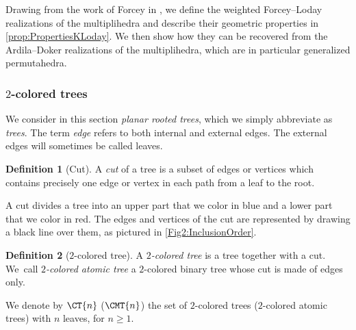 \documentclass[JEP,XML,SOM,NoFloatCountersInSection,Unicode,published]{cedram}
\theoremstyle{definition}
\newtheorem{definition}{Definition}[section]
\theoremstyle{plain}
\begin{document}
Drawing from the work of Forcey in \cite{Forcey08}, we define the weighted Forcey--Loday realizations of the multiplihedra and describe their geometric properties in \cref{prop:PropertiesKLoday}.
We then show how they can be recovered from the Ardila--Doker realizations of the multiplihedra, which are in particular generalized permutahedra.


\subsubsection{$2$-colored trees}

We consider in this section \textit{planar rooted trees}, which we simply abbreviate as \textit{trees}. The term \emph{edge} refers to both internal and external edges. The external edges will sometimes be called leaves.

\begin{definition}[Cut]
A \emph{cut} of a tree is a subset of edges or vertices which contains precisely one edge or vertex in each path from a leaf to the root.
\end{definition}

A cut divides a tree into an upper part that we color in blue and a lower part that we color in red.
The edges and vertices of the cut are represented by drawing a black line over them, as pictured in \cref{Fig2:InclusionOrder}.

\begin{definition}[$2$-colored tree] \label{def:2coloredtree}
A \emph{$2$-colored tree} is a tree together with a cut. We~call \emph{$2$-colored atomic tree} a $2$-colored binary tree whose cut is made of edges only.
\end{definition}
We denote by $\CT{n}$ (\resp $\CMT{n}$) the set of $2$-colored trees (\resp $2$-colored atomic trees) with $n$ leaves, for $n\geq 1$.
\end{document}
